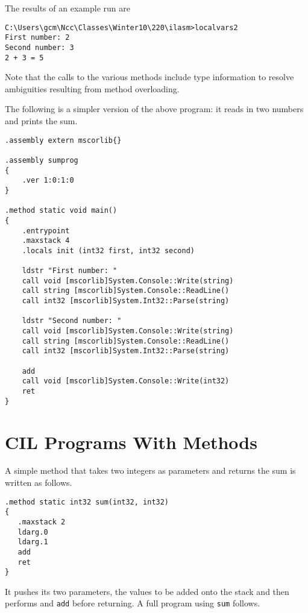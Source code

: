 \documentclass[10pt,a4paper]{amsart}
\begin{document}
The results of an example run are
\begin{verbatim}
C:\Users\gcm\Ncc\Classes\Winter10\220\ilasm>localvars2
First number: 2
Second number: 3
2 + 3 = 5
\end{verbatim}

Note that the calls to the various methods include type information to resolve
ambiguities resulting from method overloading.

The following is a simpler version of the above program: it reads in two numbers and prints the sum.

\begin{verbatim}
.assembly extern mscorlib{}

.assembly sumprog
{
    .ver 1:0:1:0
}

.method static void main()
{
    .entrypoint
    .maxstack 4    
    .locals init (int32 first, int32 second)                  

    ldstr "First number: "
    call void [mscorlib]System.Console::Write(string)
    call string [mscorlib]System.Console::ReadLine()
    call int32 [mscorlib]System.Int32::Parse(string)    
    
    ldstr "Second number: "
    call void [mscorlib]System.Console::Write(string)
    call string [mscorlib]System.Console::ReadLine()
    call int32 [mscorlib]System.Int32::Parse(string)    
    
    add
    call void [mscorlib]System.Console::Write(int32)   
    ret
}
\end{verbatim}

\section{CIL Programs With Methods}

A simple method that takes two integers as parameters and returns the sum
is written as follows.
\begin{verbatim}
.method static int32 sum(int32, int32)
{
   .maxstack 2
   ldarg.0
   ldarg.1
   add
   ret
}
\end{verbatim}
It pushes its two parameters, the values to be added onto the stack and then performs
and {\tt add} before returning. A full program using {\tt sum} follows.
\end{document}
